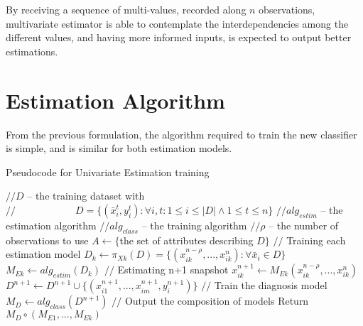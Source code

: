 By receiving a sequence of multi-values, recorded along $n$ observations, multivariate estimator is able to contemplate the interdependencies
 among the different values, and having more informed inputs, is expected to output better estimations.
 
 \section{Estimation Algorithm}
 \label{section:algorithm}
 
  From the previous formulation, the algorithm required to train the new classifier is simple, and is similar for both estimation models.
 
\begin{algorithm}
\caption{Pseudocode for Univariate Estimation training}
\label{alg:uve}
\begin{algorithmic}[1]
	\State $// D$ – the training dataset with
	\State $// \qquad\qquad\qquad D = \{(\bar{x}_i^t,y_i^t ): \forall i,t:1 \leq i \leq |D| \wedge 1 \leq t \leq n\} $
	\State $// alg_{estim}$ – the estimation algorithm
	\State $// alg_{class}$ – the training algorithm
	\State $// \rho$ – the number of observations to use
    \State $A \leftarrow \{$the set of attributes describing $D\}$
	\Statex
	\State $//$ Training each estimation model
        \State $D_k \leftarrow \pi_{Xk} (D) = \{(x_{ik}^{n-\rho},...,x_{ik}^n ): \forall \bar{x}_i \in D\} $
		\State $M_{Ek} \leftarrow alg_{estim}(D_k) $
	\EndFor
	\Statex
	\State $//$ Estimating n+1 snapshot
			\State $x_{ik}^{n+1} \leftarrow M_{Ek} (x_{ik}^{n-\rho},...,x_{ik}^n )$
			\State $ D^{n+1} \leftarrow D^{n+1} \cup \{(x_{i1}^{n+1},...,x_{im}^{n+1},y_i^{n+1} )\}$
		\EndFor
	\EndFor
	\Statex
	\State $//$ Train the diagnosis model
	\State $M_D \leftarrow  alg_{class}(D^{n+1})$
	\Statex
	\State $//$ Output the composition of models
	\State Return $M_D \circ (M_{E1},...,M_{Ek})$
\EndProcedure
\Statex
\end{algorithmic}
\end{algorithm}

